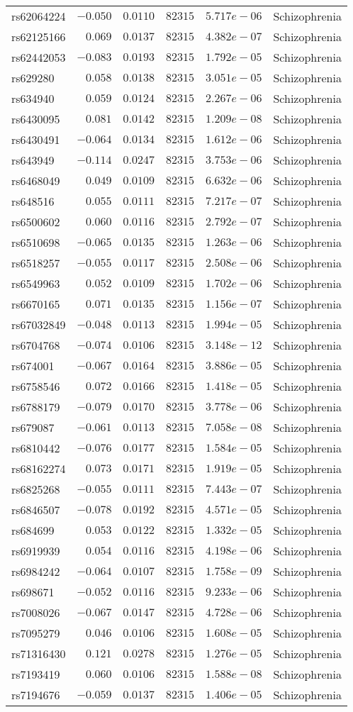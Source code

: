 \begin{tabular}{lrrrrl}
rs62064224&$-0.050$&$0.0110$&$ 82315$&$5.717e-06$&Schizophrenia\tabularnewline
rs62125166&$ 0.069$&$0.0137$&$ 82315$&$4.382e-07$&Schizophrenia\tabularnewline
rs62442053&$-0.083$&$0.0193$&$ 82315$&$1.792e-05$&Schizophrenia\tabularnewline
rs629280&$ 0.058$&$0.0138$&$ 82315$&$3.051e-05$&Schizophrenia\tabularnewline
rs634940&$ 0.059$&$0.0124$&$ 82315$&$2.267e-06$&Schizophrenia\tabularnewline
rs6430095&$ 0.081$&$0.0142$&$ 82315$&$1.209e-08$&Schizophrenia\tabularnewline
rs6430491&$-0.064$&$0.0134$&$ 82315$&$1.612e-06$&Schizophrenia\tabularnewline
rs643949&$-0.114$&$0.0247$&$ 82315$&$3.753e-06$&Schizophrenia\tabularnewline
rs6468049&$ 0.049$&$0.0109$&$ 82315$&$6.632e-06$&Schizophrenia\tabularnewline
rs648516&$ 0.055$&$0.0111$&$ 82315$&$7.217e-07$&Schizophrenia\tabularnewline
rs6500602&$ 0.060$&$0.0116$&$ 82315$&$2.792e-07$&Schizophrenia\tabularnewline
rs6510698&$-0.065$&$0.0135$&$ 82315$&$1.263e-06$&Schizophrenia\tabularnewline
rs6518257&$-0.055$&$0.0117$&$ 82315$&$2.508e-06$&Schizophrenia\tabularnewline
rs6549963&$ 0.052$&$0.0109$&$ 82315$&$1.702e-06$&Schizophrenia\tabularnewline
rs6670165&$ 0.071$&$0.0135$&$ 82315$&$1.156e-07$&Schizophrenia\tabularnewline
rs67032849&$-0.048$&$0.0113$&$ 82315$&$1.994e-05$&Schizophrenia\tabularnewline
rs6704768&$-0.074$&$0.0106$&$ 82315$&$3.148e-12$&Schizophrenia\tabularnewline
rs674001&$-0.067$&$0.0164$&$ 82315$&$3.886e-05$&Schizophrenia\tabularnewline
rs6758546&$ 0.072$&$0.0166$&$ 82315$&$1.418e-05$&Schizophrenia\tabularnewline
rs6788179&$-0.079$&$0.0170$&$ 82315$&$3.778e-06$&Schizophrenia\tabularnewline
rs679087&$-0.061$&$0.0113$&$ 82315$&$7.058e-08$&Schizophrenia\tabularnewline
rs6810442&$-0.076$&$0.0177$&$ 82315$&$1.584e-05$&Schizophrenia\tabularnewline
rs68162274&$ 0.073$&$0.0171$&$ 82315$&$1.919e-05$&Schizophrenia\tabularnewline
rs6825268&$-0.055$&$0.0111$&$ 82315$&$7.443e-07$&Schizophrenia\tabularnewline
rs6846507&$-0.078$&$0.0192$&$ 82315$&$4.571e-05$&Schizophrenia\tabularnewline
rs684699&$ 0.053$&$0.0122$&$ 82315$&$1.332e-05$&Schizophrenia\tabularnewline
rs6919939&$ 0.054$&$0.0116$&$ 82315$&$4.198e-06$&Schizophrenia\tabularnewline
rs6984242&$-0.064$&$0.0107$&$ 82315$&$1.758e-09$&Schizophrenia\tabularnewline
rs698671&$-0.052$&$0.0116$&$ 82315$&$9.233e-06$&Schizophrenia\tabularnewline
rs7008026&$-0.067$&$0.0147$&$ 82315$&$4.728e-06$&Schizophrenia\tabularnewline
rs7095279&$ 0.046$&$0.0106$&$ 82315$&$1.608e-05$&Schizophrenia\tabularnewline
rs71316430&$ 0.121$&$0.0278$&$ 82315$&$1.276e-05$&Schizophrenia\tabularnewline
rs7193419&$ 0.060$&$0.0106$&$ 82315$&$1.588e-08$&Schizophrenia\tabularnewline
rs7194676&$-0.059$&$0.0137$&$ 82315$&$1.406e-05$&Schizophrenia\tabularnewline

\end{tabular}
